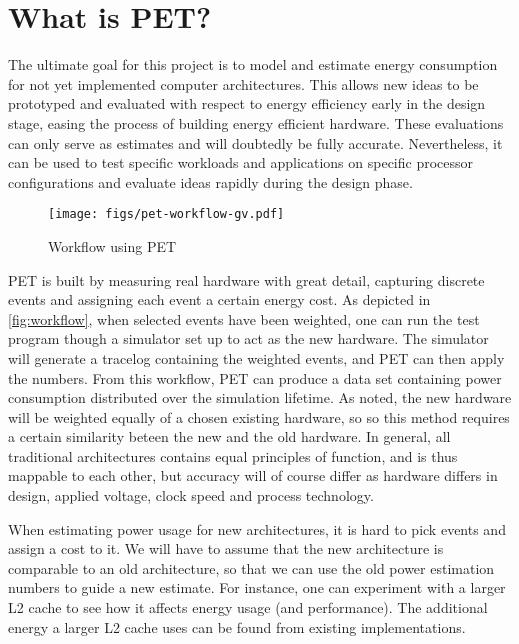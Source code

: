 \section{What is PET?}
\label{sec:whatispet}
The ultimate goal for this project is to model and estimate energy consumption
for not yet implemented computer architectures. This allows new ideas to be prototyped
and evaluated with respect to energy efficiency early in the design stage,
easing the process of building energy efficient hardware. These evaluations can
only serve as estimates and will doubtedly be fully accurate. Nevertheless, it
can be used to test specific workloads and applications on specific processor
configurations and evaluate ideas rapidly during the design phase.

\begin{figure}
    \texttt{[image: figs/pet-workflow-gv.pdf]}
    \caption{Workflow using PET}
    \label{fig:workflow}
\end{figure}

PET is built by measuring real hardware with great detail, capturing discrete
events and assigning each event a certain energy cost. As depicted in
\autoref{fig:workflow}, when selected events have been weighted, one can run the
test program though a simulator set up to act as the new hardware. The simulator
will generate a tracelog containing the weighted events, and PET can then apply
the numbers. From this workflow, PET can produce a data set containing power
consumption distributed over the simulation lifetime. As noted, the new hardware
will be weighted equally of a chosen existing hardware, so so this method
requires a certain similarity beteen the new and the old hardware. In general,
all traditional architectures contains equal principles of function, and is thus
mappable to each other, but accuracy will of course differ as hardware differs
in design, applied voltage, clock speed and process technology.

When estimating power usage for new architectures, it is hard to pick events and
assign a cost to it. We will have to assume that the new architecture is
comparable to an old architecture, so that we can use the old power estimation
numbers to guide a new estimate. For instance, one can experiment with a
larger L2 cache to see how it affects energy usage (and performance). The
additional energy a larger L2 cache uses can be found from existing
implementations.
